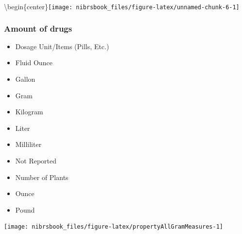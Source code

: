\documentclass[
  12pt,
  openany]{book}
\providecommand{\tightlist}{%
  \setlength{\itemsep}{0pt}\setlength{\parskip}{0pt}}
\begin{document}
\textbackslash begin\{center\}\texttt{[image: nibrsbook\_files/figure-latex/unnamed-chunk-6-1]}

\hypertarget{amount-of-drugs}{%
\subsubsection{Amount of drugs}\label{amount-of-drugs}}

\begin{itemize}
\tightlist
\item
  Dosage Unit/Items (Pills, Etc.)
\item
  Fluid Ounce
\item
  Gallon\\
\item
  Gram
\item
  Kilogram\\
\item
  Liter\\
\item
  Milliliter
\item
  Not Reported
\item
  Number of Plants\\
\item
  Ounce
\item
  Pound
\end{itemize}

\begin{center}\texttt{[image: nibrsbook\_files/figure-latex/propertyAllGramMeasures-1]} \end{center}

  
\end{document}
